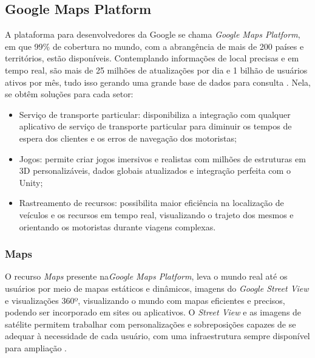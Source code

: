 \newpage
\subsection{Google Maps Platform}

A plataforma para desenvolvedores da Google se chama \textit{Google Maps Platform}, em que 99\% de cobertura no mundo, com a abrangência de mais de 200 países e territórios, estão disponíveis. Contemplando informações de local precisas e em tempo real, são mais de 25 milhões de atualizações por dia e 1 bilhão de usuários ativos por mês, tudo isso gerando uma grande base de dados para consulta \cite{google:2019}. Nela, se obtêm soluções para cada setor:
\begin{itemize}
    \item Serviço de transporte particular: disponibiliza a integração com qualquer aplicativo de serviço de transporte particular para diminuir os tempos de espera dos clientes e os erros de navegação dos motoristas;
    \item Jogos: permite criar jogos imersivos e realistas com milhões de estruturas em 3D personalizáveis, dados globais atualizados e integração perfeita com o Unity;
    \item Rastreamento de recursos: possibilita maior eficiência na localização de veículos e os recursos em tempo real, visualizando o trajeto dos mesmos e orientando os motoristas durante viagens complexas. 
\end{itemize}

\subsubsection{Maps}
O recurso \textit{Maps} presente na\textit{Google Maps Platform}, leva o mundo real até os usuários por meio de mapas estáticos e dinâmicos, imagens do \textit{Google Street View} e visualizações 360º, visualizando o mundo com mapas eficientes e precisos, podendo ser incorporado em sites ou aplicativos. O \textit{Street View} e as imagens de satélite permitem  trabalhar com personalizações e sobreposições capazes de se adequar à necessidade de cada usuário, com uma infraestrutura sempre disponível para ampliação \cite{google:2019}. 

